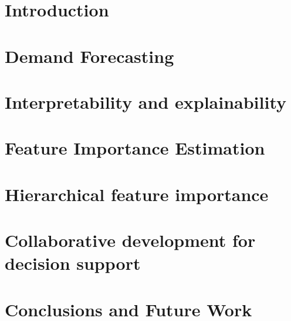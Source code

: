 
\chapter{Introduction}\label{ch:introduction}



\chapter{Demand Forecasting}
\label{ch:demand_forecasting}



\chapter{Interpretability and explainability}
\label{ch:interpretability_explainability}



\chapter{Feature Importance Estimation}
\label{sec:feature_importance_estimation}



\chapter{Hierarchical feature importance}
\label{ch:hierarchical_feature_importance}


\chapter{Collaborative development for decision support}
\label{ch:collaborative_development}



\chapter{Conclusions and Future Work}
\label{ch:conclusions}

